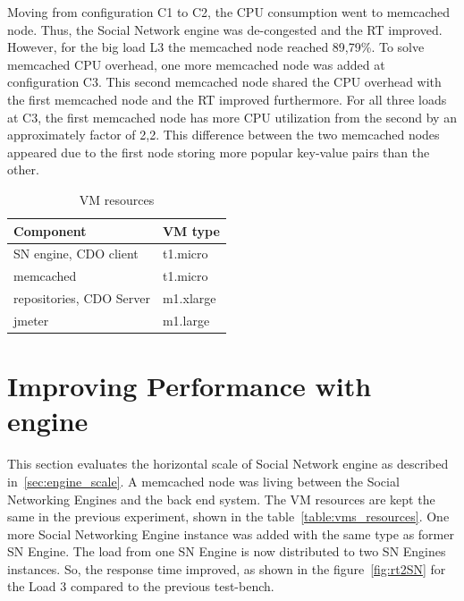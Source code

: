Moving from configuration C1 to C2, the CPU consumption went to memcached node. Thus, the Social Network engine was de-congested and the RT improved. However, for the big load L3 the memcached node reached 89,79\%. To solve memcached CPU overhead, one more memcached node was added at configuration C3. This second memcached node shared the CPU overhead with the first memcached node and the RT improved furthermore. For all three loads at C3, the first memcached node has more CPU utilization from the second by an approximately factor of 2,2. This difference between the two memcached nodes appeared due to the first node storing more popular key-value pairs than the other.

\begin{table}[]
\label{table:vms_resources}
\centering
\caption{VM resources}
\label{my-label}
\begin{tabular}{|l|l|}
\hline
 Component &  VM type \\ \hline
 SN engine, CDO client &  t1.micro \\ \hline
 memcached &  t1.micro \\ \hline
 repositories, CDO Server &  m1.xlarge \\ \hline
 jmeter &  m1.large \\ \hline
\end{tabular}
\end{table}

\section{Improving Performance with engine}
This section evaluates the horizontal scale of Social Network engine as described in~\ref{sec:engine_scale}. A memcached node was living between the Social Networking Engines and the back end system. The VM resources are kept the same in the previous experiment, shown in the table~\ref{table:vms_resources}. One more Social Networking Engine instance was added with the same type as former SN Engine. The load from one SN Engine is now distributed to two SN Engines instances. So, the response time improved, as shown in the figure~\ref{fig:rt2SN} for the Load 3 compared to the previous test-bench. 

